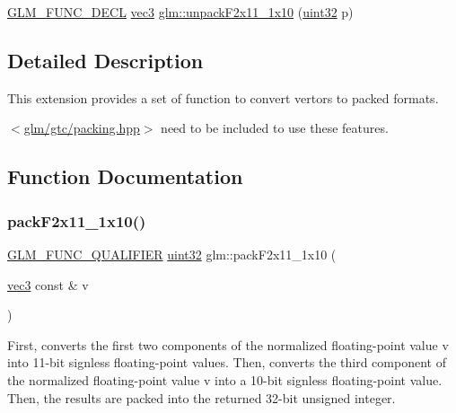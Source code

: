 \begin{DoxyCompactItemize}
\item 
\hyperlink{setup_8hpp_ab2d052de21a70539923e9bcbf6e83a51}{G\+L\+M\+\_\+\+F\+U\+N\+C\+\_\+\+D\+E\+CL} \hyperlink{group__core__types_ga1c47e8b3386109bc992b6c48e91b0be7}{vec3} \hyperlink{group__gtc__packing_ga8b9c7991eb021d95c778bf5c0b2f7824}{glm\+::unpack\+F2x11\+\_\+1x10} (\hyperlink{group__gtc__type__precision_ga202b6a53c105fcb7e531f9b443518451}{uint32} p)
\end{DoxyCompactItemize}


\subsection{Detailed Description}
This extension provides a set of function to convert vertors to packed formats. 

$<$\hyperlink{gtc_2packing_8hpp}{glm/gtc/packing.\+hpp}$>$ need to be included to use these features. 

\subsection{Function Documentation}
\mbox{\label{group__gtc__packing_ga8c2a0eeee677ca4dafd9e093d9e81062}} 
\subsubsection{\texorpdfstring{pack\+F2x11\+\_\+1x10()}{packF2x11\_1x10()}}
{\footnotesize\ttfamily \hyperlink{setup_8hpp_a33fdea6f91c5f834105f7415e2a64407}{G\+L\+M\+\_\+\+F\+U\+N\+C\+\_\+\+Q\+U\+A\+L\+I\+F\+I\+ER} \hyperlink{group__gtc__type__precision_ga202b6a53c105fcb7e531f9b443518451}{uint32} glm\+::pack\+F2x11\+\_\+1x10 (\begin{DoxyParamCaption}\item[{\hyperlink{group__core__types_ga1c47e8b3386109bc992b6c48e91b0be7}{vec3} const \&}]{v }\end{DoxyParamCaption})}

First, converts the first two components of the normalized floating-\/point value v into 11-\/bit signless floating-\/point values. Then, converts the third component of the normalized floating-\/point value v into a 10-\/bit signless floating-\/point value. Then, the results are packed into the returned 32-\/bit unsigned integer.

